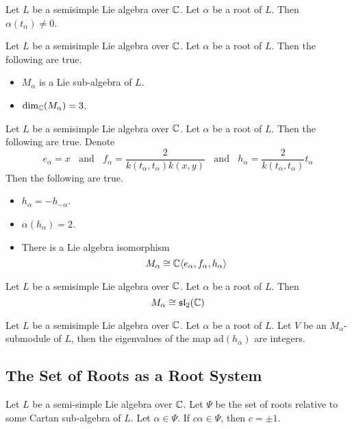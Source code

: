 \documentclass[a4paper]{article}
\begin{document}
\begin{lmm}{}{} Let $L$ be a semisimple Lie algebra over $\mathbb{C}$. Let $\alpha$ be a root of $L$. Then $\alpha(t_\alpha)\neq 0$. 
\end{lmm}

\begin{prp}{}{} Let $L$ be a semisimple Lie algebra over $\mathbb{C}$. Let $\alpha$ be a root of $L$. Then the following are true. 
\begin{itemize}
\item $M_\alpha$ is a Lie sub-algebra of $L$. 
\item $\dim_{\mathbb{C}}(M_\alpha)=3$. 
\end{itemize}
\end{prp}

\begin{prp}{}{} Let $L$ be a semisimple Lie algebra over $\mathbb{C}$. Let $\alpha$ be a root of $L$. Then the following are true. Denote $$e_\alpha=x\;\;\text{ and }\;\;f_\alpha=\frac{2}{k(t_\alpha,t_\alpha)k(x,y)}\;\;\text{ and }\;\;h_\alpha=\frac{2}{k(t_\alpha,t_\alpha)}t_\alpha$$ Then the following are true. 
\begin{itemize}
\item $h_\alpha=-h_{-\alpha}$. 
\item $\alpha(h_\alpha)=2$. 
\item There is a Lie algebra isomorphism $$M_\alpha\cong\mathbb{C}\langle e_\alpha,f_\alpha,h_\alpha\rangle$$
\end{itemize}
\end{prp}

\begin{prp}{}{} Let $L$ be a semisimple Lie algebra over $\mathbb{C}$. Let $\alpha$ be a root of $L$. Then $$M_\alpha\cong\mathfrak{sl}_2(\mathbb{C})$$
\end{prp}

\begin{prp}{}{} Let $L$ be a semisimple Lie algebra over $\mathbb{C}$. Let $\alpha$ be a root of $L$. Let $V$ be an $M_\alpha$-submodule of $L$, then the eigenvalues of the map $\text{ad}(h_\alpha)$ are integers. 
\end{prp}

\subsection{The Set of Roots as a Root System}
\begin{prp}{}{} Let $L$ be a semi-simple Lie algebra over $\mathbb{C}$. Let $\Psi$ be the set of roots relative to some Cartan sub-algebra of $L$. Let $\alpha\in\Psi$. If $c\alpha\in\Psi$, then $c=\pm1$. 
\end{prp}
\end{document}
